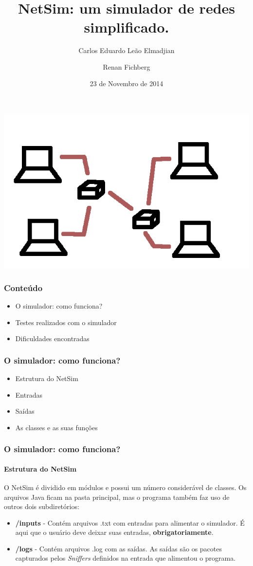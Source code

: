 \documentclass{beamer}
\title[NetSim: um simulador de redes simplificado.]{NetSim: um simulador de redes simplificado.}
\author{Carlos Eduardo Leão Elmadjian \and Renan Fichberg}
\date{23 de Novembro de 2014}
\institute{Instituto de Matemática e Estatística da Universidade de São Paulo (IME-USP)}
\begin{document}
\begin{frame}
	\titlepage
\end{frame}

\begin{frame}
\begin{center}
	\includegraphics[scale=0.3]{simulator.png}
\end{center}
\end{frame}

\begin{frame}
	\frametitle{Conteúdo}
	\begin{itemize}
		\item O simulador: como funciona?
		\item Testes realizados com o simulador
		\item Dificuldades encontradas
	\end{itemize}
\end{frame}

\begin{frame}
	\frametitle{O simulador: como funciona?}
	\begin{itemize}
		\item Estrutura do NetSim
		\item Entradas
		\item Saídas
		\item As classes e as suas funções
	\end{itemize}
\end{frame}

\begin{frame}
	\frametitle{O simulador: como funciona?}
	\framesubtitle{Estrutura do NetSim}
	O NetSim é dividido em módulos e possui um número considerável de classes.  
	Os arquivos Java ficam na pasta principal, mas o programa também faz uso de outros dois subdiretórios:
	\begin{itemize}
		\item \textbf{/inputs} - Contém arquivos .txt com entradas para alimentar o simulador. É aqui que o usuário deve deixar suas entradas, \textbf{obrigatoriamente}.
		\item \textbf{/logs} - Contém arquivos .log com as saídas. As saídas são os pacotes capturados pelos \textit{Sniffers} definidos na entrada que alimentou o programa.
	\end{itemize}
\end{frame}
\end{document}
